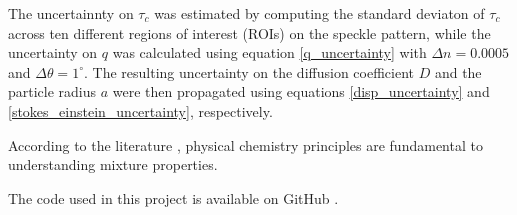 The uncertainnty on $\tau_c$ was estimated by computing the standard deviaton of $\tau_c$ across ten different regions of interest (ROIs) on the speckle pattern, while the uncertainty on $q$ was calculated using equation \eqref{q_uncertainty} with $\Delta n = 0.0005$  and $\Delta \theta = 1 ^\circ$. The resulting uncertainty on the diffusion coefficient $D$ and the particle radius $a$ were then propagated using equations \eqref{disp_uncertainty} and \eqref{stokes_einstein_uncertainty}, respectively.


According to the literature \cite{atkins2010physical}, physical chemistry principles 
are fundamental to understanding mixture properties.

The code used in this project is available on GitHub \cite{mycode}.